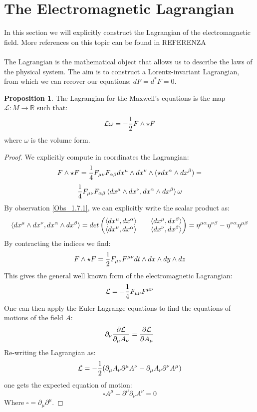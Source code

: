 \documentclass[12pt,a4paper]{report}
\theoremstyle{definition}
\theoremstyle{Theorem}
\newtheorem{Prop}[Def]{Proposition}
\theoremstyle{definition}
\theoremstyle{definition}
\begin{document}
	\section{The Electromagnetic Lagrangian}
	In this section we will explicitly construct the Lagrangian of the electromagnetic field. More references on this topic can be found in REFERENZA
	\\\\
	The Lagrangian is the mathematical object that allows us to describe the laws of the physical system. The aim is to construct a Lorentz-invariant Lagrangian, from which we can recover our equations: $dF=d^*F=0$.
	\begin{Prop}\label{Prop_8.1.2}
		The Lagrangian for the Maxwell's equations is the map $\mathcal{L}:M\rightarrow \mathbb{R}$ such that:
		$$\mathcal{L}\omega=-{1\over 2}F\wedge \star F$$
		where $\omega$ is the volume form.
	\end{Prop}
	\begin{proof}
		We explicitly compute in coordinates the Lagrangian:
		$$F\wedge \star F={1\over 4}F_{\mu\nu}F_{\alpha\beta}dx^\mu\wedge dx^\nu \wedge (\star dx^\alpha\wedge dx^\beta)=$$
		$${1\over 4}F_{\mu\nu}F_{\alpha\beta}\braket{dx^\mu\wedge dx^\nu,dx^\alpha\wedge dx^\beta}\omega$$
		By observation \ref{Obs_1.7.1}, we can explicitly write the scalar product as:
		$$\braket{dx^\mu\wedge dx^\nu,dx^\alpha\wedge dx^\beta}=det
		\begin{pmatrix}
			\braket{dx^\mu,dx^\alpha} && \braket{dx^\mu,dx^\beta}\\
			\braket{dx^\nu,dx^\alpha} && \braket{dx^\nu,dx^\beta}\\
		\end{pmatrix}=\eta^{\mu\alpha}\eta^{\nu\beta}-\eta^{\nu\alpha}\eta^{\mu\beta}$$
		By contracting the indices we find:
		$$F\wedge \star F={1\over 2}F_{\mu\nu}F^{\mu\nu}dt\wedge dx\wedge dy\wedge dz$$
		This gives the general well known form of the electromagnetic Lagrangian:
		$$\mathcal{L}=-{1\over 4}F_{\mu\nu}F^{\mu\nu}$$
		One can then apply the Euler Lagrange equations to find the equations of motions of the field $A$:
		$$\partial_\nu{\partial \mathcal{L}\over \partial_\mu A_\nu}={\partial \mathcal{L}\over \partial A_\mu}$$
		Re-writing the Lagrangian as:
		$$\mathcal{L}=-{1\over 2}(\partial_\mu A_\nu\partial^\mu A^\nu-\partial_\mu A_\nu\partial^\nu A^\mu)$$
		one gets the expected equation of motion:
		$$\square A^\mu-\partial^\mu\partial_\nu A^\nu=0$$
		Where $\square=\partial_\mu\partial^\mu$.
	\end{proof}
\end{document}
